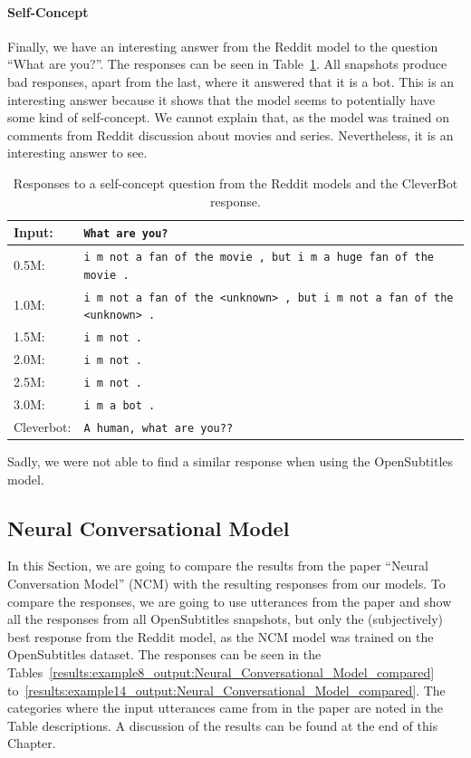 \paragraph{Self-Concept} Finally, we have an interesting answer from the Reddit model to the question ``What are you?''. The responses can be seen in Table~\ref{results:example7_output:Reddit_compared}. All snapshots produce bad responses, apart from the last, where it answered that it is a bot. This is an interesting answer because it shows that the model seems to potentially have some kind of self-concept. We cannot explain that, as the model was trained on comments from Reddit discussion about movies and series. Nevertheless, it is an interesting answer to see.

\begin{table}[H]
	\centering
	\begin{adjustbox}{max width=\textwidth}
		\begin{tabularx}{\textwidth}{lX}
			\toprule
			Input: 	& \texttt{What are you?}\\
			\midrule
			0.5M: 	& \texttt{i m not a fan of the movie , but i m a huge fan of the movie .}\\
			1.0M: 	& \texttt{i m not a fan of the <unknown> , but i m not a fan of the <unknown> .}\\
			1.5M:	& \texttt{i m not .}\\
			2.0M:	& \texttt{i m not .}\\
			2.5M:	& \texttt{i m not .}\\
			3.0M:	& \texttt{i m a bot .}\\
			Cleverbot:	& \texttt{A human, what are you??}\\
			\bottomrule
		\end{tabularx}
	\end{adjustbox}
	\caption{Responses to a self-concept question from the Reddit models and the CleverBot response.}
	\label{results:example7_output:Reddit_compared}
\end{table}

Sadly, we were not able to find a similar response when using the OpenSubtitles model.

\subsection{Neural Conversational Model}
\label{results:comparison:ncm}
In this Section, we are going to compare the results from the paper ``Neural Conversation Model'' (NCM) with the resulting responses from our models. To compare the responses, we are going to use utterances from the paper and show all the responses from all OpenSubtitles snapshots, but only the (subjectively) best response from the Reddit model, as the NCM model was trained on the OpenSubtitles dataset. The responses can be seen in the Tables~\ref{results:example8_output:Neural_Conversational_Model_compared} to~\ref{results:example14_output:Neural_Conversational_Model_compared}. The categories where the input utterances came from in the paper are noted in the Table descriptions. A discussion of the results can be found at the end of this Chapter.

